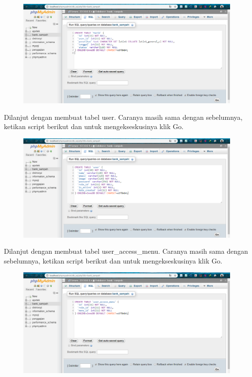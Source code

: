 \begin{figure}[H]
\centering
\includegraphics[width=1\textwidth]{figures/database/8.png}
\end{figure}

\noindent
Dilanjut dengan membuat tabel user. Caranya masih sama dengan sebelumnya, ketikan script berikut dan untuk mengekseskusinya klik Go.



\begin{figure}[H]
\centering
\includegraphics[width=1\textwidth]{figures/database/9.png}
\end{figure}

\noindent
Dilanjut dengan membuat tabel user\_access\_menu. Caranya masih sama dengan sebelumnya, ketikan script berikut dan untuk mengekseskusinya klik Go.



\begin{figure}[H]
\centering
\includegraphics[width=1\textwidth]{figures/database/10.png}
\end{figure}

